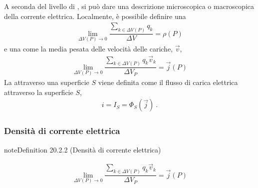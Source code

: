 \documentclass[letterpaper,10pt,italian]{jupyterBook}
\begin{document}
\sphinxAtStartPar
A seconda del livello di {\hyperref[\detokenize{ch/intro/current-status:physics-hs-intro-current-status-micro-macro}]{}}, si può dare una descrizione microscopica o macroscopica della corrente elettrica. Localmente, è possibile definire una 
\begin{equation*}
\begin{split}\lim_{\Delta V(P) \rightarrow 0} \dfrac{\sum_{k \in \Delta V(P)} q_k}{\Delta V} = \rho(P)\end{split}
\end{equation*}
\sphinxAtStartPar
e una  come la media pesata delle velocità delle cariche, \(\vec{v}\),
\begin{equation*}
\begin{split}\lim_{\Delta V(P) \rightarrow 0} \dfrac{\sum_{k \in \Delta V(P)} q_k \vec{v}_k}{\Delta V_P} = \vec{j}(P)\end{split}
\end{equation*}
\sphinxAtStartPar
La  attraverso una superficie \(S\) viene definita come il flusso di carica elettrica attraverso la superficie \(S\),
\begin{equation*}
\begin{split}i = I_{S} = \Phi_{S}(\vec{j}) \ .\end{split}
\end{equation*}

\subsubsection{Densità di corrente elettrica}
\label{\detokenize{ch/electromagnetism/electric-current:densita-di-corrente-elettrica}}\label{\detokenize{ch/electromagnetism/electric-current:electric-current-density-def}}\label{ch/electromagnetism/electric-current:electric-current-density}
\begin{sphinxadmonition}{note}{Definition 20.2.2 (Densità di corrente elettrica)}


\begin{equation*}
\begin{split}\lim_{\Delta V(P) \rightarrow 0} \dfrac{\sum_{k \in \Delta V(P)} q_k \vec{v}_k}{\Delta V_P} = \vec{j}(P)\end{split}
\end{equation*}\end{sphinxadmonition}
\end{document}
